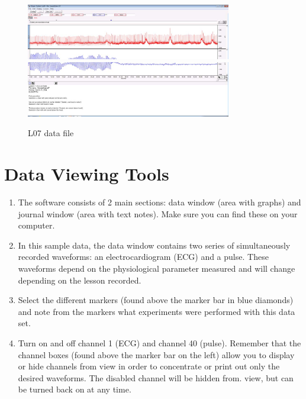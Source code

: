 \documentclass{article}
\begin{document}
\begin{enumerate}
		\begin{figure}[h]
		\includegraphics[width=0.8\textwidth]{../images/BIOPAC_5a.jpg}
		\includegraphics[width=0.8\textwidth]{../images/BIOPAC_5b.jpg}
		\centering
		\caption{L07 data file}
		\label{sample_data}
		\end{figure}
	
\end{enumerate}

\section*{Data Viewing Tools}
\begin{enumerate}
	\item The software consists of 2 main sections: data window (area with graphs) and journal window (area with text notes). Make sure you can find these on your computer.
	\item In this sample data, the data window contains two series of simultaneously recorded waveforms: an electrocardiogram (ECG) and a pulse. These waveforms depend on the physiological parameter measured and will change depending on the lesson recorded.
	\item Select the different markers (found above the marker bar in blue diamonds) and note from the markers what experiments were performed with this data set.
	\item Turn on and off channel 1 (ECG) and channel 40 (pulse). Remember that the channel boxes (found above the marker bar on the left) allow you to display or hide channels from view in order to concentrate or print out only the desired waveforms. The disabled channel will be hidden from. view, but can be turned back on at any time.
\end{enumerate}
\end{document}
